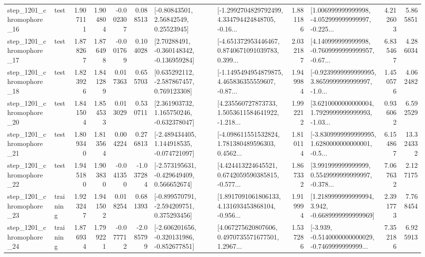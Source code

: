 \begin{tabular}{llrrrrllrlrr}
 step\_1201\_chromophore\_16 &      test &      1.907111 &    1.904804 &     -0.002307 &  0.088513 &       [-0.80843501, 2.56842549, 0.25523945] &  [-1.2992704829792499, 4.334794424848705, -0.16... &       1.881186 &  [1.006999999999998, -4.052999999999997, -0.225... &            4.212603 &          5.865851 \\
 step\_1201\_chromophore\_17 &      test &      1.878267 &    1.876498 &     -0.001769 &  0.104028 &    [2.70288491, -0.360148342, -0.136959284] &  [-4.651372953446467, 0.8740671091039783, 0.399... &       2.032187 &  [4.140999999999998, -0.7609999999999957, -0.67... &            6.835467 &          4.286034 \\
 step\_1201\_chromophore\_18 &      test &      1.823926 &    1.841289 &      0.017363 &  0.655703 &    [0.635292112, -2.587867457, 0.769123308] &  [-1.1495494954879875, 4.465836355559607, -0.87... &       1.949984 &  [-0.9239999999999995, 3.8659999999999997, -1.0... &            1.450576 &          4.062482 \\
 step\_1201\_chromophore\_20 &      test &      1.841504 &    1.854533 &      0.013029 &  0.530711 &    [2.361903732, 1.165750246, -0.632378047] &  [4.235560727873733, 1.5053611584641922, -1.218... &       1.992212 &  [3.6210000000000004, 1.7929999999999993, -1.03... &            0.936062 &          6.592529 \\
 step\_1201\_chromophore\_21 &      test &      1.809340 &    1.813564 &      0.004224 &  0.276813 &   [-2.489434405, 1.144918535, -0.074721097] &  [-4.098611551532824, 1.781380489596303, 0.4562... &       1.810114 &  [-3.8309999999999995, 1.6280000000000001, -0.5... &            6.154867 &         13.324332 \\
 step\_1201\_chromophore\_22 &      test &      1.945180 &    1.903830 &     -0.041350 & -1.037284 &   [-2.573195631, -0.429649409, 0.566652674] &  [4.424413224645521, 0.6742059590385815, -0.577... &       1.867332 &  [3.991999999999999, 0.5549999999999997, -0.378... &            7.067632 &          2.127175 \\
 step\_1201\_chromophore\_23 &  training &      1.923247 &    1.941502 &      0.018254 &  0.681393 &   [-0.899570791, -2.594209751, 0.375293456] &  [1.8917091061806133, 4.131693453868104, -0.956... &       1.919994 &   [1.2189999999999994, 3.942, -0.6689999999999969] &            2.391773 &          7.768454 \\
 step\_1201\_chromophore\_24 &  training &      1.876934 &    1.799221 &     -0.077712 & -2.085799 &  [-2.606201656, -0.320131986, -0.852677851] &  [4.067275620807606, 0.4970735571677501, 1.2967... &       1.537286 &  [-3.939, -0.5140000000000029, -0.7469999999999... &            7.352186 &          6.925913 \\

\end{tabular}
